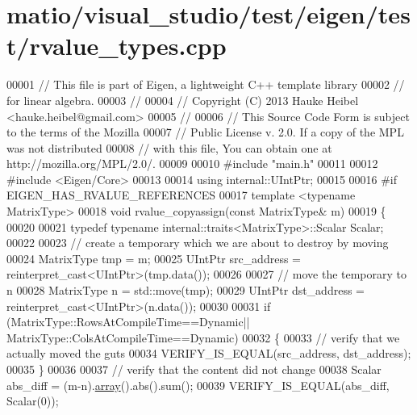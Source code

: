 \hypertarget{matio_2visual__studio_2test_2eigen_2test_2rvalue__types_8cpp_source}{}\section{matio/visual\+\_\+studio/test/eigen/test/rvalue\+\_\+types.cpp}
\label{matio_2visual__studio_2test_2eigen_2test_2rvalue__types_8cpp_source}

\begin{DoxyCode}
00001 \textcolor{comment}{// This file is part of Eigen, a lightweight C++ template library}
00002 \textcolor{comment}{// for linear algebra.}
00003 \textcolor{comment}{//}
00004 \textcolor{comment}{// Copyright (C) 2013 Hauke Heibel <hauke.heibel@gmail.com>}
00005 \textcolor{comment}{//}
00006 \textcolor{comment}{// This Source Code Form is subject to the terms of the Mozilla}
00007 \textcolor{comment}{// Public License v. 2.0. If a copy of the MPL was not distributed}
00008 \textcolor{comment}{// with this file, You can obtain one at http://mozilla.org/MPL/2.0/.}
00009 
00010 \textcolor{preprocessor}{#include "main.h"}
00011 
00012 \textcolor{preprocessor}{#include <Eigen/Core>}
00013 
00014 \textcolor{keyword}{using} internal::UIntPtr;
00015 
00016 \textcolor{preprocessor}{#if EIGEN\_HAS\_RVALUE\_REFERENCES}
00017 \textcolor{keyword}{template} <\textcolor{keyword}{typename} MatrixType>
00018 \textcolor{keywordtype}{void} rvalue\_copyassign(\textcolor{keyword}{const} MatrixType& m)
00019 \{
00020 
00021   \textcolor{keyword}{typedef} \textcolor{keyword}{typename} internal::traits<MatrixType>::Scalar Scalar;
00022   
00023   \textcolor{comment}{// create a temporary which we are about to destroy by moving}
00024   MatrixType tmp = m;
00025   UIntPtr src\_address = \textcolor{keyword}{reinterpret\_cast<}UIntPtr\textcolor{keyword}{>}(tmp.data());
00026   
00027   \textcolor{comment}{// move the temporary to n}
00028   MatrixType n = std::move(tmp);
00029   UIntPtr dst\_address = \textcolor{keyword}{reinterpret\_cast<}UIntPtr\textcolor{keyword}{>}(n.data());
00030 
00031   \textcolor{keywordflow}{if} (MatrixType::RowsAtCompileTime==Dynamic|| MatrixType::ColsAtCompileTime==Dynamic)
00032   \{
00033     \textcolor{comment}{// verify that we actually moved the guts}
00034     VERIFY\_IS\_EQUAL(src\_address, dst\_address);
00035   \}
00036 
00037   \textcolor{comment}{// verify that the content did not change}
00038   Scalar abs\_diff = (m-n).\hyperlink{class_eigen_1_1array}{array}().abs().sum();
00039   VERIFY\_IS\_EQUAL(abs\_diff, Scalar(0));

\end{DoxyCode}
